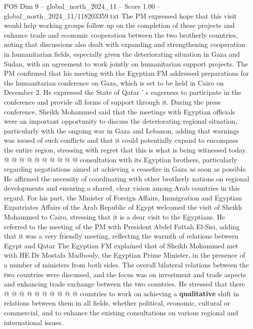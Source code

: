 \begin{textsample}{POS Dim 9 – global\_north\_2024\_11 – Score 1.00 – global\_north\_2024\_11/118203359.txt}  \label{ex:f9_pos_402}
The PM expressed hope that this visit would help working groups follow up on the completion of these projects and enhance trade and economic cooperation between the two brotherly countries, noting that discussions also dealt with expanding and strengthening cooperation in humanitarian fields, especially given the deteriorating situation in Gaza and Sudan, with an agreement to work jointly on humanitarian support projects.
The PM confirmed that his meeting with the Egyptian FM addressed preparations for the humanitarian conference on Gaza, which is set to be held in Cairo on December 2.
He expressed the State of Qatar ' s eagerness to participate in the conference and provide all forms of support through it.
During the press conference, Sheikh Mohammed said that the meetings with Egyptian officials were an important opportunity to discuss the deteriorating regional situation, particularly with the ongoing war in Gaza and Lebanon, adding that warnings was issued of such conflicts and that it could potentially expand to encompass the entire region, stressing with regret that this is what is being witnessed today. @ @ @ @ @ @ @ @ @ @ consultation with its Egyptian brothers, particularly regarding negotiations aimed at achieving a ceasefire in Gaza as soon as possible.
He affirmed the necessity of coordinating with other brotherly nations on regional developments and ensuring a shared, clear vision among Arab countries in this regard.
For his part, the Minister of Foreign Affairs, Immigration and Egyptian Expatriates Affairs of the Arab Republic of Egypt welcomed the visit of Sheikh Mohammed to Cairo, stressing that it is a dear visit to the Egyptians.
He referred to the meeting of the PM with President Abdel Fattah El-Sisi, adding that it was a very friendly meeting, reflecting the warmth of relations between Egypt and Qatar The Egyptian FM explained that of Sheikh Mohammed met with HE Dr Mostafa Madbouly, the Egyptian Prime Minister, in the presence of a number of ministers from both sides.
The overall bilateral relations between the two countries were discussed, and the focus was on investment and trade aspects and enhancing trade exchange between the two countries.
He stressed that there @ @ @ @ @ @ @ @ @ @ countries to work on achieving a \textbf{qualitative} shift in relations between them in all fields, whether political, economic, cultural or commercial, and to enhance the existing consultations on various regional and international issues.

\end{textsample}
